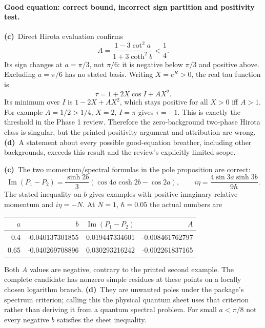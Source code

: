 \documentclass[11pt,a4paper]{article}
\newcommand{\Lc}{\textbf{(c)}\ }
\newcommand{\Ld}{\textbf{(d)}\ }
\begin{document}
\paragraph{Good equation: correct bound, incorrect sign partition and positivity test.}
\Lc Direct Hirota evaluation confirms
\begin{equation}
 A=\frac{1-3\cot^2a}{1+3\coth^2b}<\frac14.
\end{equation}
Its sign changes at $a=\pi/3$, not $\pi/6$: it is negative below
$\pi/3$ and positive above. Excluding $a=\pi/6$ has no stated basis.
Writing $X=e^R>0$, the real tau function is
\begin{equation}
 \tau=1+2X\cos I+AX^2.
\end{equation}
Its minimum over $I$ is $1-2X+AX^2$, which stays positive for all $X>0$
iff $A>1$. For example $A=1/2>1/4$, $X=2$, $I=\pi$ gives $\tau=-1$.
This is exactly the threshold in the Phase 1 review. Therefore the
zero-background two-phase Hirota class is singular, but the printed
positivity argument and attribution are wrong. \Ld A statement about every
possible good-equation breather, including other backgrounds, exceeds this
result and the review's explicitly limited scope.

\Lc The two momentum/spectral formulas in the pole proposition are correct:
\begin{equation}
 \operatorname{Im}(P_1-P_2)=\frac{\sinh2b}{3}
 (\cos4a\cosh2b-\cos2a),\qquad
 i\eta=\frac{4\sin3a\sinh3b}{9\hbar}.
\end{equation}
The stated inequality on $b$ gives examples with positive imaginary relative
momentum and $i\eta=-N$. At $N=1$, $\hbar=0.05$ the actual numbers are
\begin{center}
\begin{tabular}{rrrr}\toprule
$a$ & $b$ & $\operatorname{Im}(P_1-P_2)$ & $A$\\\midrule
0.4 & -0.040137301855 & 0.019447334601 & -0.008461762797\\
0.65 & -0.040269708896 & 0.030293216242 & -0.002261837165\\\bottomrule
\end{tabular}
\end{center}
Both $A$ values are negative, contrary to the printed second example.
The complete candidate has nonzero simple residues at these points on a
locally chosen logarithm branch. \Ld They are unwanted poles under the
package's spectrum criterion; calling this the physical quantum sheet uses
that criterion rather than deriving it from a quantum spectral problem.
For small $a<\pi/8$ not every negative $b$ satisfies the sheet inequality.
\end{document}
